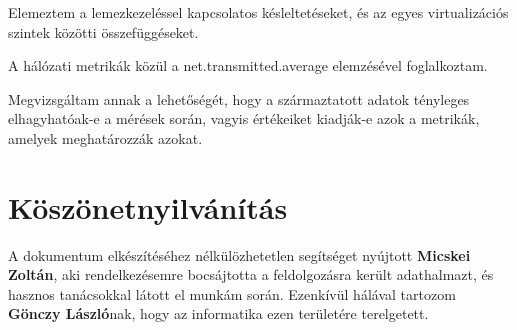 \documentclass[a4paper,10pt,titlepage]{article}
\begin{document}
Elemeztem a lemezkezeléssel kapcsolatos késleltetéseket, és az egyes virtualizációs szintek közötti összefüggéseket.

A hálózati metrikák közül a net.transmitted.average elemzésével foglalkoztam.

Megvizsgáltam annak a lehetőségét, hogy a származtatott adatok tényleges elhagyhatóak-e a mérések során, vagyis értékeiket kiadják-e azok a metrikák, amelyek meghatározzák azokat.


\section{Köszönetnyilvánítás}

A dokumentum elkészítéséhez nélkülözhetetlen segítséget nyújtott \textbf{Micskei Zoltán}, aki rendelkezésemre bocsájtotta a feldolgozásra került adathalmazt, és hasznos tanácsokkal látott el munkám során. Ezenkívül hálával tartozom \textbf{Gönczy László}nak, hogy az informatika ezen területére terelgetett.


\end{document}
